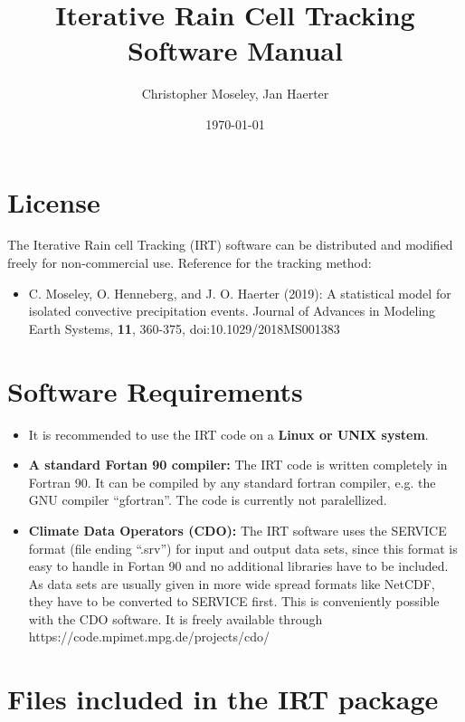 \documentclass[11pt]{article}
\begin{document}
\title{Iterative Rain Cell Tracking Software Manual}
\author{Christopher Moseley, Jan Haerter}
\date{\today}
\maketitle

\section{License}

The Iterative Rain cell Tracking (IRT) software can be distributed and modified freely for non-commercial use. Reference for the tracking method:
\begin{itemize}
\item C. Moseley, O. Henneberg, and J. O. Haerter (2019): A statistical model for isolated convective precipitation events. Journal of Advances in Modeling Earth Systems, {\bf 11}, 360-375, doi:10.1029/2018MS001383
\end{itemize}

\section{Software Requirements}

\begin{itemize}
\item It is recommended to use the IRT code on a {\bf Linux or UNIX system}.
\item {\bf A standard Fortan 90 compiler:} The IRT code is written completely in Fortran 90. It can be compiled by any standard fortran compiler, e.g. the GNU compiler ``gfortran''. The code is currently not paralellized.
\item {\bf Climate Data Operators (CDO):} The IRT software uses the SERVICE format (file ending ``.srv'') for input and output data sets, since this format is easy to handle in Fortan 90 and no additional libraries have to be included. As data sets are usually given in more wide spread formats like NetCDF, they have to be converted to SERVICE first. This is conveniently possible with the CDO software. It is freely available through  https://code.mpimet.mpg.de/projects/cdo/
\end{itemize}

\section{Files included in the IRT package}
\end{document}

